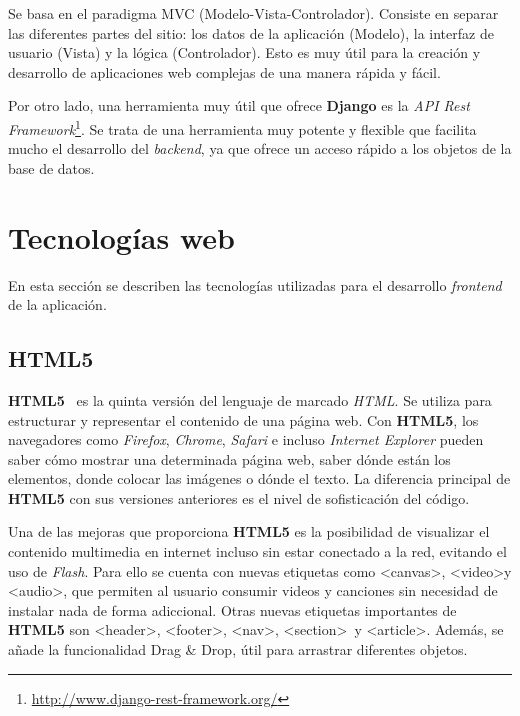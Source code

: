 \documentclass[a4paper, 12pt]{book}
\begin{document}
Se basa en el paradigma MVC (Modelo-Vista-Controlador). Consiste en separar las diferentes partes del sitio: los datos de la aplicación (Modelo), la interfaz de usuario (Vista) y la lógica (Controlador). Esto es muy útil para la creación y desarrollo de aplicaciones web complejas de una manera rápida y fácil.
\newline

Por otro lado, una herramienta muy útil que ofrece \textbf{Django} es la \textit{API Rest Framework}\footnote{\url{http://www.django-rest-framework.org/}}. Se trata de una herramienta muy potente y flexible que facilita mucho el desarrollo del \textit{backend}, ya que ofrece un acceso rápido a los objetos de la base de datos.


\section{Tecnologías web} 
\label{sec:tecnologias-web}

En esta sección se describen las tecnologías utilizadas para el desarrollo \textit{frontend} de la aplicación.

\subsection{HTML5} 
\label{subsec:html5}

\textbf{HTML5}~\cite{pagina-html5} es la quinta versión del lenguaje de marcado \textit{HTML}. Se utiliza para estructurar y representar el contenido de una página web. Con \textbf{HTML5}, los navegadores como \textit{Firefox}, \textit{Chrome}, \textit{Safari} e incluso \textit{Internet Explorer} pueden saber cómo mostrar una determinada página web, saber dónde están los elementos, donde colocar las imágenes o dónde el texto. La diferencia principal de \textbf{HTML5} con sus versiones anteriores es el nivel de sofisticación del código.
\newline

Una de las mejoras que proporciona \textbf{HTML5} es la posibilidad de visualizar el contenido multimedia en internet incluso sin estar conectado a la red, evitando el uso de \textit{Flash}. Para ello se cuenta con nuevas etiquetas como \textless  canvas\textgreater, \textless  video\textgreater y \textless  audio\textgreater, que permiten al usuario consumir videos y canciones sin necesidad de instalar nada de forma adiccional. Otras nuevas etiquetas importantes de \textbf{HTML5} son \textless  header\textgreater, \textless  footer\textgreater, \textless  nav\textgreater, \textless  section\textgreater ~y \textless  article\textgreater. Además, se añade la funcionalidad Drag \& Drop, útil para arrastrar diferentes objetos.
\end{document}
